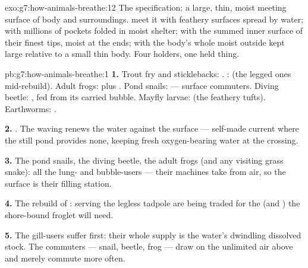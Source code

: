 \begin{solution}{exo:g7:how-animals-breathe:12}
The specification: a large, thin, moist meeting surface of
body and surroundings.  meet it with feathery surfaces
spread by water;  with millions of pockets folded in
moist shelter;  with the summed inner surface of
their finest tips, moist at the ends;  with the body's
whole moist outside kept large relative to a small thin
body. Four holders, one held thing.
\end{solution}

\begin{solution}{pb:g7:how-animals-breathe:1}
\textbf{1.} Trout fry and sticklebacks: . :
 (the legged ones mid-rebuild). Adult frogs: 
plus . Pond snails:  --- surface commuters. Diving
beetle: , fed from its carried bubble. Mayfly
larvae:  (the feathery tufts). Earthworms: .

\textbf{2.} . The waving renews the water against the
 surface --- self-made current where the still pond
provides none, keeping fresh oxygen-bearing water at the
crossing.

\textbf{3.} The pond snails, the diving beetle, the adult
frogs (and any visiting grass snake): all the lung- and
bubble-users --- their machines take  from air, so
the surface is their filling station.

\textbf{4.} The  rebuild of : 
serving the legless tadpole are being traded for the 
(and  ) the shore-bound froglet will need.

\textbf{5.} The gill-users suffer first: their whole supply
is the water's dwindling dissolved stock. The commuters ---
snail, beetle, frog --- draw on the unlimited air above and
merely commute more often.


\end{solution}
